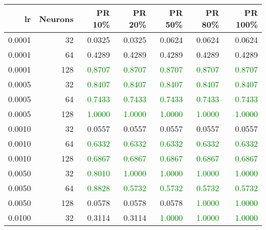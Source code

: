 \begin{tabular}{rrrrrrr}
\toprule
lr & Neurons & PR 10\% & PR 20\% & PR 50\% & PR 80\% & PR 100\% \\
\midrule
0.0001 & 32 & \textcolor{blu} {0.0325} & \textcolor{blu} {0.0325} & \textcolor{blu} {0.0624} & \textcolor{blu} {0.0624} & \textcolor{blu} {0.0624} \\
0.0001 & 64 & \textcolor{blu} {0.4289} & \textcolor{blu} {0.4289} & \textcolor{blu} {0.4289} & \textcolor{blu} {0.4289} & \textcolor{blu} {0.4289} \\
0.0001 & 128 & \textcolor{green} {0.8707} & \textcolor{green} {0.8707} & \textcolor{green} {0.8707} & \textcolor{green} {0.8707} & \textcolor{green} {0.8707} \\
0.0005 & 32 & \textcolor{green} {0.8407} & \textcolor{green} {0.8407} & \textcolor{green} {0.8407} & \textcolor{green} {0.8407} & \textcolor{green} {0.8407} \\
0.0005 & 64 & \textcolor{green} {0.7433} & \textcolor{green} {0.7433} & \textcolor{green} {0.7433} & \textcolor{green} {0.7433} & \textcolor{green} {0.7433} \\
0.0005 & 128 & \textcolor{green} {1.0000} & \textcolor{green} {1.0000} & \textcolor{green} {1.0000} & \textcolor{green} {1.0000} & \textcolor{green} {1.0000} \\
0.0010 & 32 & \textcolor{blu} {0.0557} & \textcolor{blu} {0.0557} & \textcolor{blu} {0.0557} & \textcolor{blu} {0.0557} & \textcolor{blu} {0.0557} \\
0.0010 & 64 & \textcolor{green} {0.6332} & \textcolor{green} {0.6332} & \textcolor{green} {0.6332} & \textcolor{green} {0.6332} & \textcolor{green} {0.6332} \\
0.0010 & 128 & \textcolor{green} {0.6867} & \textcolor{green} {0.6867} & \textcolor{green} {0.6867} & \textcolor{green} {0.6867} & \textcolor{green} {0.6867} \\
0.0050 & 32 & \textcolor{green} {0.8010} & \textcolor{green} {1.0000} & \textcolor{green} {1.0000} & \textcolor{green} {1.0000} & \textcolor{green} {1.0000} \\
0.0050 & 64 & \textcolor{green} {0.8828} & \textcolor{green} {0.5732} & \textcolor{green} {0.5732} & \textcolor{green} {0.5732} & \textcolor{green} {0.5732} \\
0.0050 & 128 & \textcolor{blu} {0.0578} & \textcolor{blu} {0.0578} & \textcolor{blu} {0.0578} & \textcolor{green} {1.0000} & \textcolor{green} {1.0000} \\
0.0100 & 32 & \textcolor{blu} {0.3114} & \textcolor{blu} {0.3114} & \textcolor{green} {1.0000} & \textcolor{green} {1.0000} & \textcolor{green} {1.0000} \\

\end{tabular}

